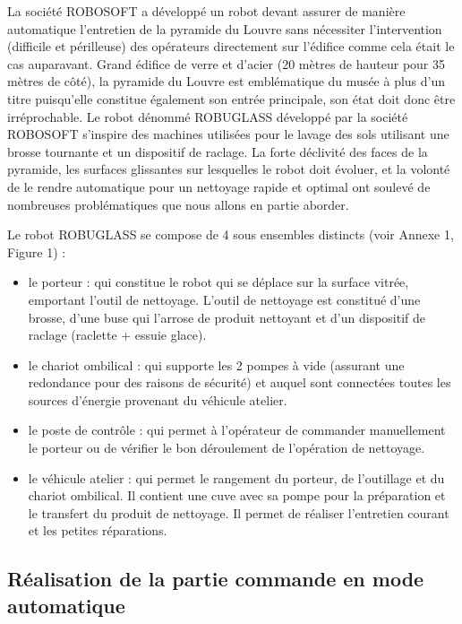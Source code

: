 La société ROBOSOFT a développé un robot devant assurer de manière automatique l'entretien de la pyramide du Louvre sans nécessiter l'intervention (difficile et périlleuse) des opérateurs directement sur l'édifice comme cela était le cas auparavant. Grand édifice de verre et d'acier (20 mètres de hauteur pour 35 mètres de côté), la pyramide du Louvre
est emblématique du musée à plus d'un titre puisqu'elle constitue également son entrée principale, son état doit donc être irréprochable. Le robot dénommé ROBUGLASS développé par la société ROBOSOFT s'inspire des machines utilisées pour le lavage des sols utilisant une brosse tournante et un dispositif de raclage. La forte déclivité des faces de la pyramide, les surfaces glissantes sur lesquelles le robot doit évoluer, et la volonté de le rendre automatique pour un
nettoyage rapide et optimal ont soulevé de nombreuses problématiques que nous allons en partie aborder.

Le robot ROBUGLASS se compose de 4 sous ensembles distincts (voir Annexe 1, Figure 1) :
\begin{itemize}
 \item le porteur : qui constitue le robot qui se déplace sur la surface vitrée, emportant l'outil de nettoyage. L'outil de nettoyage est constitué d'une brosse, d'une buse qui l'arrose de produit nettoyant et d'un dispositif de raclage (raclette + essuie glace).
 \item le chariot ombilical : qui supporte les 2 pompes à vide (assurant une redondance pour des raisons de sécurité) et auquel sont connectées toutes les sources d'énergie provenant du véhicule atelier.
 \item le poste de contrôle : qui permet à l'opérateur de commander manuellement le porteur ou de vérifier le bon déroulement de l'opération de nettoyage.
 \item le véhicule atelier : qui permet le rangement du porteur, de l'outillage et du chariot ombilical. Il contient une cuve avec sa pompe pour la préparation et le transfert du produit de nettoyage. Il permet de réaliser l'entretien courant et les petites réparations.
\end{itemize}

\subsection{Réalisation de la partie commande en mode automatique}

